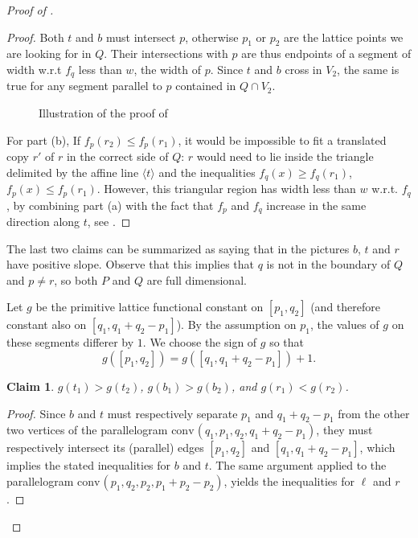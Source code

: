 \documentclass{amsart}
\theoremstyle{plain}
\newtheorem{claim}[theorem]{Claim}
\theoremstyle{definition}
\newcommand{\conv}{\ensuremath{\mathrm{conv}}\hspace{1pt}}
\begin{document}
\begin{proof}[Proof of ]
\begin{proof}
Both $t$ and $b$ must intersect $p$, otherwise $p_1$ or $p_2$ are the lattice points we are looking for in $Q$.  Their intersections with $p$ are thus endpoints of a segment of width w.r.t $f_q$ less than $w$, the width of $p$. Since $t$ and $b$ cross in $V_2$, the same is true for any segment parallel to $p$ contained in $Q \cap V_2$.  

\begin{figure}[htb]
\scalebox{.75}{}
\caption{Illustration of the proof of }
\label{fig:claim3}
\end{figure}

For part (b), If $f_p(r_2) \leq f_p(r_1)$, it would be impossible to fit a translated copy $r'$ of $r$ in the correct side of $Q$: $r$ would need to lie inside the triangle delimited by the affine line $\langle t \rangle$ and the inequalities $f_q(x) \geq f_q(r_1)$, $f_p(x) \leq f_p(r_1)$. However, this triangular region has width less than $w$  w.r.t. $f_q$, by combining part (a) with the fact that $f_p$ and $f_q$ increase in the same direction along $t$, see . 
\end{proof}

The last two claims can be summarized as saying that in the pictures $b$, $t$ and $r$ have positive slope. Observe that this implies that $q$ is not in the boundary of $Q$ and $p \neq r$, so both $P$ and $Q$ are full dimensional.


Let $g$ be the primitive lattice functional constant on $[p_1, q_2]$ (and therefore constant also on $[q_1, q_1+q_2-p_1]$). By the assumption on $p_1$, the values of $g$ on these segments differer by $1$. We choose the sign of $g$ so that 
\[
g([p_1, q_2])= g( [q_1, q_1+q_2-p_1]) +1. 
\]

\begin{claim}
\label{claim:g}
$g(t_1) > g(t_2)$, $g(b_1) > g(b_2)$, and $g(r_1) < g(r_2)$.
\end{claim}

\begin{proof}
Since $b$ and $t$ must respectively separate $p_1$ and $q_1+q_2-p_1$ from the other two vertices of the parallelogram $\conv(q_1, p_1, q_2, q_1+q_2-p_1)$, they must respectively intersect its (parallel) edges $[p_1, q_2]$ and $[q_1, q_1+q_2-p_1]$, which implies the stated inequalities for $b$ and $t$.
The same argument  applied to the parallelogram  $\conv(p_1, q_2, p_2, p_1+p_2-p_2)$, yields the inequalities for $\ell$ and $r$.
\end{proof}


\end{proof}
\end{document}
